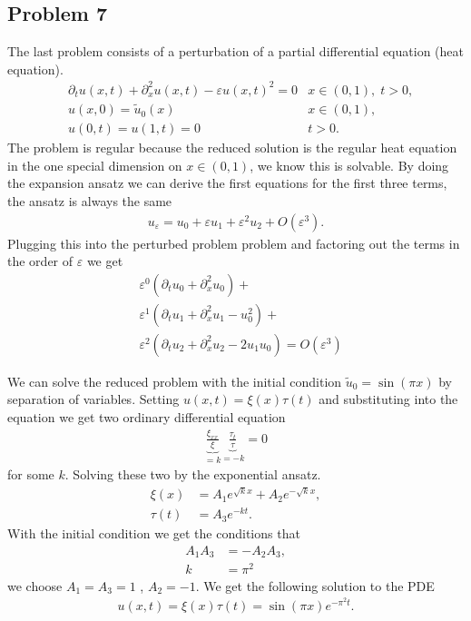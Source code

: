 \documentclass[a4paper]{article}
\newcommand{\eps}{\varepsilon}
\begin{document}
\subsection{Problem 7}
The last problem consists of a perturbation of a partial differential
equation (heat equation).
\begin{align}
    &\partial_t u(x, t) + \partial_x^2 u(x,t) - \eps u(x, t)^2 = 0
    &x\in (0, 1),\; t>0,\\
    &u(x, 0) = \tilde{u}_0(x)  &x\in(0, 1), \\
    &u(0, t) = u(1, t) = 0 & t>0.
\end{align}
The problem is regular because the reduced solution is the regular heat
equation in the one special dimension on $x\in (0, 1)$, we know this is
solvable. By doing the expansion ansatz we can derive the first equations
for the first three terms, the ansatz is always the same
\begin{align}
    u_\eps = u_0 + \eps u_1 + \eps^2 u_2 + O(\eps^3).
\end{align}
Plugging this into the perturbed problem problem and factoring out the terms
in the order of $\eps$ we get
\begin{align}
    &\eps^0 (\partial_t u_0 + \partial_x^2 u_0) + \\
    &\eps^1 (\partial_t u_1 + \partial_x^2 u_1 - u_0^2) +\\
    &\eps^2 (\partial_t u_2 + \partial_x^2 u_2 - 2u_1u_0)  = O(\eps^3)
\end{align}

We can solve the reduced problem with the initial condition $\tilde{u}_0 =
\sin(\pi x)$ by separation of variables. Setting $u(x, t) = \xi(x) \tau(t)$
and substituting into the equation we get two ordinary differential equation
\begin{align}
    \underbrace{\frac{\xi_{xx}}{\xi}}_{=k}
    \underbrace{\frac{\tau_t}{\tau}}_{=-k} =  0
\end{align}
for some $k$. Solving these two by the exponential ansatz.
\begin{align}
    \xi(x) &= A_1 e^{\sqrt{k} x} +A_2 e^{-\sqrt{k} x},\\
    \tau(t) &= A_3 e^{-kt}.
\end{align}
With the initial condition we get the conditions that
\begin{align}
    A_1A_3 &= -A_2 A_3,\\
    k &= \pi^2
\end{align}
we choose $A_1 = A_3 = 1$ , $A_2 = -1$. We get the following solution to the
PDE
\begin{align}
    u(x, t) = \xi(x)\tau(t) = \sin(\pi x) e^{-\pi^2 t}.
\end{align}

\end{document}
